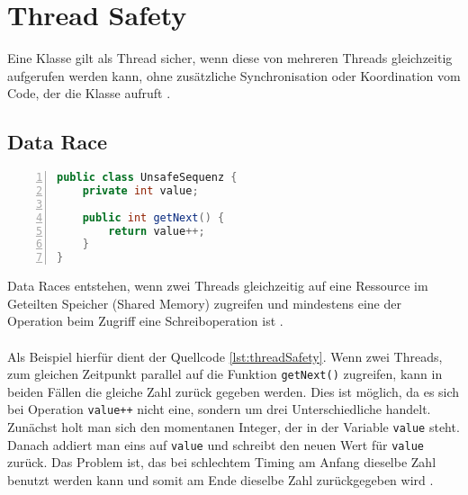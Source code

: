 \section{Thread Safety}\label{sec:threadSafety}

Eine Klasse gilt als Thread sicher, wenn diese von mehreren Threads gleichzeitig aufgerufen werden kann, ohne zusätzliche Synchronisation oder Koordination vom Code, der die Klasse aufruft \cite[vgl.][12]{brian}.



\subsection*{Data Race}
\begin{lstlisting}[language=Java,frame=tb,caption={Non-thread-safe Sequence Generator \cite{brian}}, label={lst:threadSafety}, numbers=left, stepnumber=1, captionpos=b, tabsize=4]
public class UnsafeSequenz {
	private int value;
	
	public int getNext() {
		return value++;
	}
}
\end{lstlisting}
\noindent
Data Races entstehen, wenn zwei Threads gleichzeitig auf eine Ressource im Geteilten Speicher (Shared Memory) zugreifen und mindestens eine der Operation beim Zugriff eine Schreiboperation ist \cite[vgl.][72]{banerjee_theory_2006}.\\ 
\\
Als Beispiel hierfür dient der Quellcode \ref{lst:threadSafety}. Wenn zwei Threads, zum gleichen Zeitpunkt parallel auf die Funktion \texttt{getNext()} zugreifen, kann in beiden Fällen die gleiche Zahl zurück gegeben werden. Dies ist möglich, da es sich bei Operation \texttt{value++} nicht eine, sondern um drei Unterschiedliche handelt. Zunächst holt man sich den momentanen Integer, der in der Variable \texttt{value} steht. Danach addiert man eins auf \texttt{value} und schreibt den neuen Wert für \texttt{value} zurück. Das Problem ist, das bei schlechtem Timing am Anfang dieselbe Zahl benutzt werden kann und somit am Ende dieselbe Zahl zurückgegeben wird \cite[vgl.][5]{brian}.

